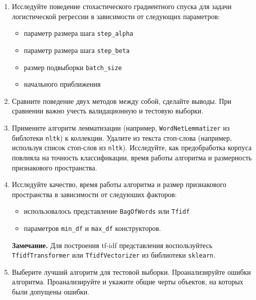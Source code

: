 \documentclass[10pt,fleqn]{article}
\begin{document}
\begin{enumerate}
\begin{itemize}
        \item При желании можно проанализировать зависимость значения функции потерь и зависимость точности от реального времени работы метода и их отличия от зависимости от итерации.
    \end{itemize}

    \item Исследуйте поведение стохастического градиентного спуска для задачи логистической регрессии в зависимости от следующих параметров:
    \begin{itemize}
        \item параметр размера шага \texttt{step\_alpha}
        \item параметр размера шага \texttt{step\_beta}
        \item размер подвыборки \texttt{batch\_size}
        \item начального приближения
    \end{itemize}


    \item Сравните поведение двух методов между собой, сделайте выводы. При сравнении важно учесть валидационную и тестовую выборки.

    \item Примените алгоритм лемматизации (например,  \texttt{WordNetLemmatizer} из библотеки \texttt{nltk}) к коллекции. Удалите из текста стоп-слова (например, используя список стоп-слов из \texttt{nltk}). Исследуйте, как предобработка корпуса повлияла на точность классификации, время работы алгоритма и размерность признакового пространства.

    \item Исследуйте качество, время работы алгоритма и размер признакового пространства в зависимости от следуюших факторов:

    \begin{itemize}
        \item использовалось представление \verb|BagOfWords| или \verb|Tfidf|
        \item параметров \texttt{min\_df} и \texttt{max\_df} конструкторов.
    \end{itemize}

    \textbf{Замечание.} Для построения tf-idf представления воспользуйтесь \texttt{TfidfTransformer} или \texttt{TfidfVectorizer} из библиотеки \texttt{sklearn}.

    \item Выберите лучший алгоритм для тестовой выборки. Проанализируйте ошибки алгоритма. Проанализируйте и укажите общие черты объектов, на которых были допущены ошибки.

\end{enumerate}
\end{document}
